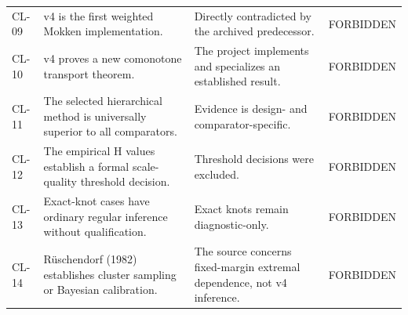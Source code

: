 {\begin{longtable}{p{}p{}p{}>{\raggedright\arraybackslash}p{}}
CL-09 & v4 is the first weighted Mokken implementation. & Directly contradicted by the archived predecessor. & FORBIDDEN \\[2pt]
CL-10 & v4 proves a new comonotone transport theorem. & The project implements and specializes an established result. & FORBIDDEN \\[2pt]
CL-11 & The selected hierarchical method is universally superior to all comparators. & Evidence is design- and comparator-specific. & FORBIDDEN \\[2pt]
CL-12 & The empirical H values establish a formal scale-quality threshold decision. & Threshold decisions were excluded. & FORBIDDEN \\[2pt]
CL-13 & Exact-knot cases have ordinary regular inference without qualification. & Exact knots remain diagnostic-only. & FORBIDDEN \\[2pt]
CL-14 & Rüschendorf (1982) establishes cluster sampling or Bayesian calibration. & The source concerns fixed-margin extremal dependence, not v4 inference. & FORBIDDEN \\[2pt]
\bottomrule
\end{longtable}
}
